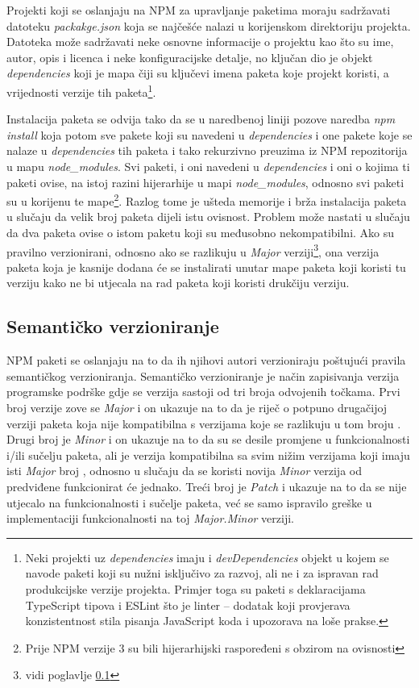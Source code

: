 \documentclass[times, utf8, diplomski, numeric]{fer}
\newcommand{\razmakp}{\vspace{18pt}}
\begin{document}
\razmakp

Projekti koji se oslanjaju na NPM za upravljanje paketima moraju sadržavati datoteku \emph{packakge.json} koja se najčešće nalazi u korijenskom direktoriju projekta.
Datoteka može sadržavati neke osnovne informacije o projektu kao što su ime, autor, opis i licenca i neke konfiguracijske detalje, no ključan dio je objekt \emph{dependencies} koji je mapa čiji su ključevi imena paketa koje projekt koristi, a vrijednosti verzije tih paketa\footnote{
    Neki projekti uz \emph{dependencies} imaju i \emph{devDependencies} objekt u kojem se navode paketi koji su nužni isključivo za razvoj, ali ne i za ispravan rad produkcijske verzije projekta. Primjer toga su paketi s deklaracijama TypeScript tipova i ESLint što je linter – dodatak koji provjerava konzistentnost stila pisanja JavaScript koda i upozorava na loše prakse.
}.

Instalacija paketa se odvija tako da se u naredbenoj liniji pozove naredba \emph{npm install} koja potom sve pakete koji su navedeni u \emph{dependencies} i one pakete koje se nalaze u \emph{dependencies} tih paketa i tako rekurzivno preuzima iz NPM repozitorija u mapu \emph{node\_modules}\citep{npm_docs}.
Svi paketi, i oni navedeni u \emph{dependencies} i oni o kojima ti paketi ovise, na istoj razini hijerarhije u mapi \emph{node\_modules}, odnosno svi paketi su u korijenu te mape\footnote{Prije NPM verzije 3 su bili hijerarhijski raspoređeni s obzirom na ovisnosti}.
Razlog tome je ušteda memorije i brža instalacija paketa u slučaju da velik broj paketa dijeli istu ovisnost.
Problem može nastati u slučaju da dva paketa ovise o istom paketu koji su međusobno nekompatibilni.
Ako su pravilno verzionirani, odnosno ako se razlikuju u \emph{Major} verziji\footnote{vidi poglavlje \ref{sec:semver}}, ona verzija paketa koja je kasnije dodana će se instalirati unutar mape paketa koji koristi tu verziju kako ne bi utjecala na rad paketa koji koristi drukčiju verziju\citep{npm_npm3}.


\newpage
\subsection{Semantičko verzioniranje} \label{sec:semver}

NPM paketi se oslanjaju na to da ih njihovi autori verzioniraju poštujući pravila semantičkog verzioniranja.
Semantičko verzioniranje je način zapisivanja verzija programske podrške gdje se verzija sastoji od tri broja odvojenih točkama.
Prvi broj verzije zove se \emph{Major} i on ukazuje na to da je riječ o potpuno drugačijoj verziji paketa koja nije kompatibilna s verzijama koje se razlikuju u tom broju .
Drugi broj je \emph{Minor} i on ukazuje na to da su se desile promjene u funkcionalnosti i/ili sučelju paketa, ali je verzija kompatibilna sa svim nižim verzijama koji imaju isti \emph{Major} broj , odnosno u slučaju da se koristi novija \emph{Minor} verzija od predviđene funkcionirat će jednako.
Treći broj je \emph{Patch} i ukazuje na to da se nije utjecalo na funkcionalnosti i sučelje paketa, već se samo ispravilo greške u implementaciji funkcionalnosti na toj \emph{Major.Minor} verziji\citep{semver}.
\end{document}

